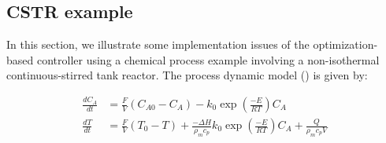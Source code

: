 \documentclass[letterpaper, 10 pt, conference]{ieeeconf}\IEEEoverridecommandlockouts%
\begin{document}
\subsection{CSTR example}\label{sec:CSTREx}
In this section, we illustrate some implementation issues of the optimization-based controller using a chemical process example involving a non-isothermal continuous-stirred tank reactor. The process dynamic model (\cite{christofides2005control}) is given by:

\begin{equation}
  \begin{aligned}
    \frac{dC_A}{dt} &= \frac{F}{V}(C_{A0} - C_A) - k_0\exp\left(\frac{-E}{RT}\right)C_A\\
    \frac{dT}{dt} &= \frac{F}{V}(T_{0} - T) + \frac{-\Delta H}{\rho_m c_p}k_0\exp\left(\frac{-E}{RT}\right)C_A + \frac{Q}{\rho_m c_p V}
  \end{aligned}
\end{equation}
\end{document}
